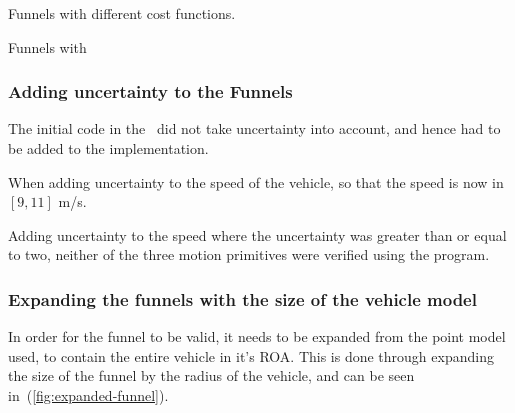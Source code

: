 Funnels with different cost functions.

Funnels with 

\subsubsection{Adding uncertainty to the Funnels}

The initial code in the~\cite[Drake toolbox]{drake} did not take uncertainty
into account, and hence had to be added to the implementation.

When adding uncertainty to the speed of the vehicle, so that the speed is now in
\([9,11]\) m/s.

Adding uncertainty to the speed where the uncertainty was greater than or equal
to two, neither of the three motion primitives were verified using the program.


\subsubsection{Expanding the funnels with the size of the vehicle model}

In order for the funnel to be valid, it needs to be expanded from the point
model used, to contain the entire vehicle in it's \ac{ROA}. This is done through
expanding the size of the funnel by the radius of the vehicle, and can be seen
in~(\ref{fig:expanded-funnel}).

